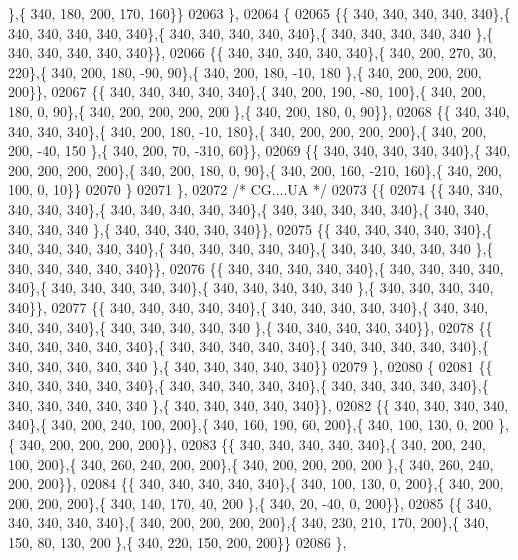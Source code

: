 \begin{DoxyCode}
      \},\{ 340, 180, 200, 170, 160\}\}
02063 \},
02064 \{
02065 \{\{ 340, 340, 340, 340, 340\},\{ 340, 340, 340, 340, 340\},\{ 340, 340, 340, 340, 340\},\{ 340, 340, 340, 340, 340
      \},\{ 340, 340, 340, 340, 340\}\},
02066 \{\{ 340, 340, 340, 340, 340\},\{ 340, 200, 270,  30, 220\},\{ 340, 200, 180, -90,  90\},\{ 340, 200, 180, -10, 180
      \},\{ 340, 200, 200, 200, 200\}\},
02067 \{\{ 340, 340, 340, 340, 340\},\{ 340, 200, 190, -80, 100\},\{ 340, 200, 180,   0,  90\},\{ 340, 200, 200, 200, 200
      \},\{ 340, 200, 180,   0,  90\}\},
02068 \{\{ 340, 340, 340, 340, 340\},\{ 340, 200, 180, -10, 180\},\{ 340, 200, 200, 200, 200\},\{ 340, 200, 200, -40, 150
      \},\{ 340, 200,  70, -310,  60\}\},
02069 \{\{ 340, 340, 340, 340, 340\},\{ 340, 200, 200, 200, 200\},\{ 340, 200, 180,   0,  90\},\{ 340, 200, 160, -210, 
      160\},\{ 340, 200, 100,   0,  10\}\}
02070 \}
02071 \},
02072 \textcolor{comment}{/* CG....UA */}
02073 \{\{
02074 \{\{ 340, 340, 340, 340, 340\},\{ 340, 340, 340, 340, 340\},\{ 340, 340, 340, 340, 340\},\{ 340, 340, 340, 340, 340
      \},\{ 340, 340, 340, 340, 340\}\},
02075 \{\{ 340, 340, 340, 340, 340\},\{ 340, 340, 340, 340, 340\},\{ 340, 340, 340, 340, 340\},\{ 340, 340, 340, 340, 340
      \},\{ 340, 340, 340, 340, 340\}\},
02076 \{\{ 340, 340, 340, 340, 340\},\{ 340, 340, 340, 340, 340\},\{ 340, 340, 340, 340, 340\},\{ 340, 340, 340, 340, 340
      \},\{ 340, 340, 340, 340, 340\}\},
02077 \{\{ 340, 340, 340, 340, 340\},\{ 340, 340, 340, 340, 340\},\{ 340, 340, 340, 340, 340\},\{ 340, 340, 340, 340, 340
      \},\{ 340, 340, 340, 340, 340\}\},
02078 \{\{ 340, 340, 340, 340, 340\},\{ 340, 340, 340, 340, 340\},\{ 340, 340, 340, 340, 340\},\{ 340, 340, 340, 340, 340
      \},\{ 340, 340, 340, 340, 340\}\}
02079 \},
02080 \{
02081 \{\{ 340, 340, 340, 340, 340\},\{ 340, 340, 340, 340, 340\},\{ 340, 340, 340, 340, 340\},\{ 340, 340, 340, 340, 340
      \},\{ 340, 340, 340, 340, 340\}\},
02082 \{\{ 340, 340, 340, 340, 340\},\{ 340, 200, 240, 100, 200\},\{ 340, 160, 190,  60, 200\},\{ 340, 100, 130,   0, 200
      \},\{ 340, 200, 200, 200, 200\}\},
02083 \{\{ 340, 340, 340, 340, 340\},\{ 340, 200, 240, 100, 200\},\{ 340, 260, 240, 200, 200\},\{ 340, 200, 200, 200, 200
      \},\{ 340, 260, 240, 200, 200\}\},
02084 \{\{ 340, 340, 340, 340, 340\},\{ 340, 100, 130,   0, 200\},\{ 340, 200, 200, 200, 200\},\{ 340, 140, 170,  40, 200
      \},\{ 340,  20, -40,   0, 200\}\},
02085 \{\{ 340, 340, 340, 340, 340\},\{ 340, 200, 200, 200, 200\},\{ 340, 230, 210, 170, 200\},\{ 340, 150,  80, 130, 200
      \},\{ 340, 220, 150, 200, 200\}\}
02086 \},

\end{DoxyCode}
